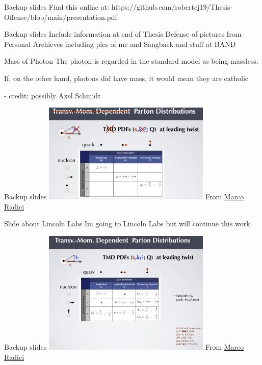 \documentclass[aspectratio=169]{beamer}
\begin{document}
\begin{frame}{Backup slides}
\centering
    Find this online at: https://github.com/robertej19/Thesis-Offense/blob/main/presentation.pdf
\end{frame}

\begin{frame}{Backup slides}
\centering
    Include information at end of Thesis Defense of pictures from Personal Archieves including pics of me and Sangbaek and stuff at BAND
\end{frame}

\begin{frame}{Mass of Photon}
\centering
The photon is regarded in the standard model as being massless.

If, on the other hand, photons did have mass, it would mean they are catholic 

- credit: possibly Axel Schmidt
\end{frame}


\begin{frame}{Backup slides}
\centering
\includegraphics[width=0.6\textwidth]{backup/pdf_lead_twist.png}
From \href{https://indico.cern.ch/event/797767/contributions/3682622/attachments/1965784/3268756/6_radici.pdf}{Marco Radici}
\end{frame}



\begin{frame}{Slide about Lincoln Labs}
Im going to Lincoln Labs but will continue this work
\end{frame}



\begin{frame}{Backup slides}
\centering
\includegraphics[width=0.6\textwidth]{backup/tmd_lead_twist.png}
From \href{https://indico.cern.ch/event/797767/contributions/3682622/attachments/1965784/3268756/6_radici.pdf}{Marco Radici}
\end{frame}
\end{document}
